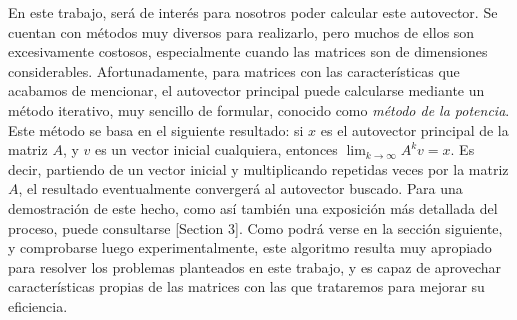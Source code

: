         En este trabajo, será de interés para nosotros poder calcular este autovector. Se cuentan con métodos muy diversos para realizarlo, pero muchos de ellos son excesivamente costosos, especialmente cuando las matrices son de dimensiones considerables. Afortunadamente, para matrices con las características que acabamos de mencionar, el autovector principal puede calcularse mediante un método iterativo, muy sencillo de formular, conocido como \emph{método de la potencia}. Este método se basa en el siguiente resultado: si $x$ es el autovector principal de la matriz $A$, y $v$ es un vector inicial cualquiera, entonces $\lim_{k\to\infty}A^k v = x$. Es decir, partiendo de un vector inicial y multiplicando repetidas veces por la matriz $A$, el resultado eventualmente convergerá al autovector buscado. Para una demostración de este hecho, como así también una exposición más detallada del proceso, puede consultarse \cite{Kamvar}[Section 3]. Como podrá verse en la sección siguiente, y comprobarse luego experimentalmente, este algoritmo resulta muy apropiado para resolver los problemas planteados en este trabajo, y es capaz de aprovechar características propias de las matrices con las que trataremos para mejorar su eficiencia.
